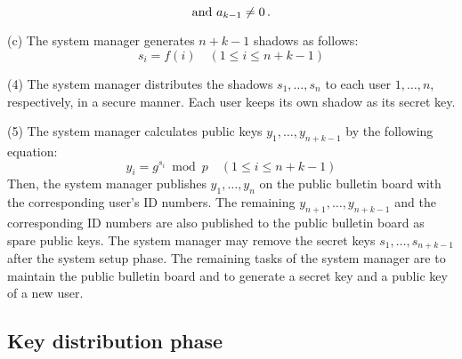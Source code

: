 \documentclass{ims9x6}
\begin{document}
\begin{arabiclist}[(2)]
\begin{alphlist}[(b)]
\[{\rm and }\ a_{k-1}\neq 0\, .
\]
\item[(c)] The system manager generates $n+k-1$ shadows as follows:
\begin{equation}	%
s_i=f(i)\quad (1\leq i\leq n+k-1)
\end{equation}
\end{alphlist}
\item[(4)] The system manager distributes the shadows $s_1,\ldots,s_n$
to each user $1,\ldots,n$, respectively, in a secure manner. Each user
keeps its own shadow as its secret key.
\item[(5)] The system manager calculates public keys
$y_1,\ldots,y_{n+k-1}$ by the following equation:
\begin{equation}	%
y_i=g^{s_i}\bmod p\quad (1\leq i\leq n+k-1)
\label{eq:PK}
\end{equation}
Then, the system manager publishes $y_1,\ldots,y_n$ on the public
bulletin board with the corresponding user's ID numbers. The remaining
$y_{n+1},\ldots,y_{n+k-1}$ and the corresponding ID numbers are also
published to the public bulletin board as spare public keys. The
system manager may remove the secret keys $s_1,\ldots,s_{n+k-1}$ after
the system setup phase. The remaining tasks of the system manager are
to maintain the public bulletin board
and to generate a secret key and a public key of a new user.
\end{arabiclist}

\subsection{Key distribution phase}
\end{document}
